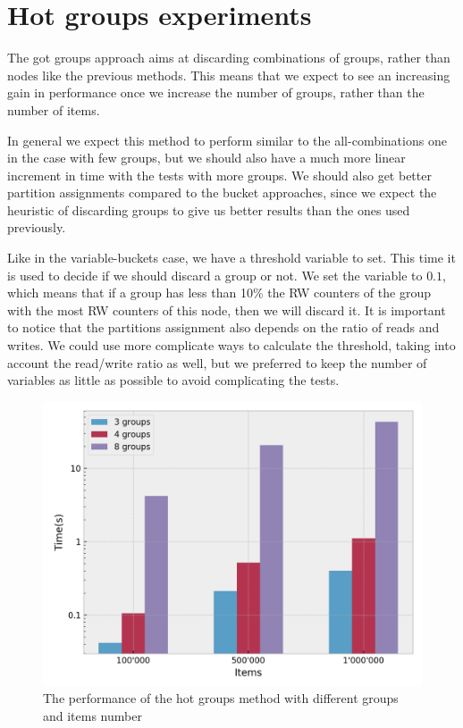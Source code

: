 \section{Hot groups experiments}\label{sec:hot-groups-experiments}
The got groups approach aims at discarding combinations of groups, rather than nodes like the previous methods. This means that we expect to see an increasing gain in performance once we increase the number of groups, rather than the number of items.

In general we expect this method to perform similar to the all-combinations one in the case with few groups, but we should also have a much more linear increment in time with the tests with more groups. We should also get better partition assignments compared to the bucket approaches, since we expect the heuristic of discarding groups to give us better results than the ones used previously.

Like in the variable-buckets case, we have a threshold variable to set. This time it is used to decide if we should discard a group or not. We set the variable to $0.1$, which means that if a group has less than 10\% the RW counters of the group with the most RW counters of this node, then we will discard it. It is important to notice that the partitions assignment also depends on the ratio of reads and writes. We could use more complicate ways to calculate the threshold, taking into account the read/write ratio as well, but we preferred to keep the number of variables as little as possible to avoid complicating the tests.

\begin{figure}[!htb]
  \centering
  \includegraphics[width=\textwidth,height=\textheight,keepaspectratio]{img/hot.png}
  \caption{The performance of the hot groups method with different groups and items number}
  \label{fig:hot}
\end{figure}

